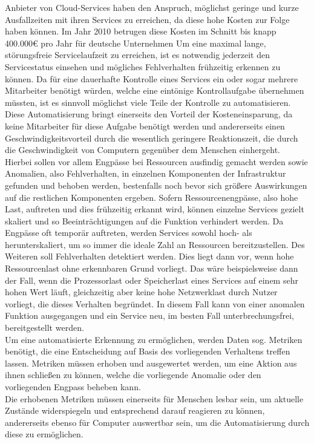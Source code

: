 \documentclass[a4paper,10pt]{scrartcl}
\begin{document}
Anbieter von Cloud-Services haben den Anspruch, möglichst geringe und kurze Ausfallzeiten mit ihren Services zu erreichen, da diese hohe Kosten zur Folge haben können. Im Jahr 2010 betrugen diese Kosten im Schnitt bis knapp 400.000€ \cite{.20200810T16:14:45.000Z} pro Jahr für deutsche Unternehmen Um eine maximal lange, störungsfreie Servicelaufzeit zu erreichen, ist es notwendig jederzeit den Servicestatus einsehen und mögliches Fehlverhalten frühzeitig erkennen zu können. 
Da für eine dauerhafte Kontrolle eines Services ein oder sogar mehrere Mitarbeiter benötigt würden, welche eine eintönige Kontrollaufgabe übernehmen müssten, ist es sinnvoll möglichst viele Teile der Kontrolle zu automatisieren. Diese Automatisierung bringt einerseits den Vorteil der Kosteneinsparung, da keine Mitarbeiter für diese Aufgabe benötigt werden und andererseits einen Geschwindigkeitsvorteil durch die wesentlich geringere Reaktionszeit, die durch die Geschwindigkeit von Computern gegenüber dem Menschen einhergeht.\\
Hierbei sollen vor allem Engpässe bei Ressourcen ausfindig gemacht werden sowie Anomalien, also Fehlverhalten, in einzelnen Komponenten der Infrastruktur gefunden und behoben werden, bestenfalls noch bevor sich größere Auswirkungen auf die restlichen Komponenten ergeben.
Sofern Ressourcenengpässe, also hohe Last, auftreten und dies frühzeitig erkannt wird, können einzelne Services gezielt skaliert und so Beeinträchtigungen auf die Funktion verhindert werden. Da Engpässe oft temporär auftreten, werden Services sowohl hoch- als herunterskaliert, um so immer die ideale Zahl an Ressourcen bereitzustellen.
Des Weiteren soll Fehlverhalten detektiert werden. Dies liegt dann vor, wenn hohe Ressourcenlast ohne erkennbaren Grund vorliegt. Das wäre beispielsweise dann der Fall, wenn die Prozessorlast oder Speicherlast eines Services auf einem sehr hohen Wert läuft, gleichzeitig aber keine hohe Netzwerklast durch Nutzer vorliegt, die dieses Verhalten begründet. In diesem Fall kann von einer anomalen Funktion ausgegangen und ein Service neu, im besten Fall unterbrechungsfrei, bereitgestellt werden. \\
Um eine automatisierte Erkennung zu ermöglichen, werden Daten sog. Metriken benötigt, die eine Entscheidung auf Basis des vorliegenden Verhaltens treffen lassen. Metriken müssen erhoben und ausgewertet werden, um eine Aktion aus ihnen schließen zu können, welche die vorliegende Anomalie oder den vorliegenden Engpass beheben kann.\\
Die erhobenen Metriken müssen einerseits für Menschen lesbar sein, um aktuelle Zustände widerspiegeln und entsprechend darauf reagieren zu können, andererseits ebenso für Computer auswertbar sein, um die Automatisierung durch diese zu ermöglichen.\\
\end{document}
